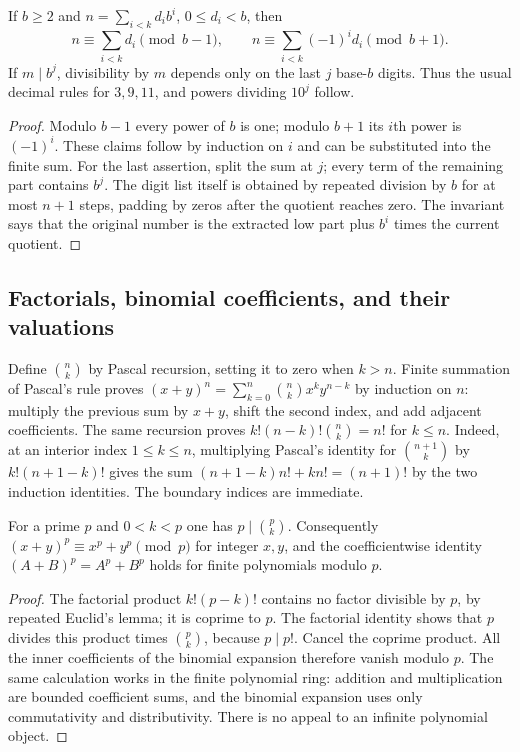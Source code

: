 \begin{theorem}\label{el:digits}
If $b\ge2$ and $n=\sum_{i<k}d_i b^i$, $0\le d_i<b$, then
\[
 n\equiv\sum_{i<k}d_i\pmod{b-1},\qquad
 n\equiv\sum_{i<k}(-1)^i d_i\pmod{b+1}.
\]
If $m\mid b^j$, divisibility by $m$ depends only on the last $j$
base-$b$ digits.  Thus the usual decimal rules for $3,9,11$, and
powers dividing $10^j$ follow.
\end{theorem}
\begin{proof}
Modulo $b-1$ every power of $b$ is one; modulo $b+1$ its $i$th power
is $(-1)^i$.  These claims follow by induction on $i$ and can be
substituted into the finite sum.  For the last assertion, split the
sum at $j$; every term of the remaining part contains $b^j$.
The digit list itself is obtained by repeated division by $b$ for at
most $n+1$ steps, padding by zeros after the quotient reaches zero.
The invariant says that the original number is the extracted low
part plus $b^i$ times the current quotient.
\end{proof}

\subsection{Factorials, binomial coefficients, and their valuations}

Define $\binom nk$ by Pascal recursion, setting it to zero when $k>n$.
Finite summation of Pascal's rule proves
$(x+y)^n=\sum_{k=0}^n\binom nkx^ky^{n-k}$ by induction on $n$:
multiply the previous sum by $x+y$, shift the second index, and add
adjacent coefficients.  The same recursion proves
$k!(n-k)!\binom nk=n!$ for $k\le n$.  Indeed, at an interior
index $1\le k\le n$, multiplying Pascal's identity for
$\binom{n+1}{k}$ by $k!(n+1-k)!$ gives the sum
$(n+1-k)n!+kn!=(n+1)!$ by the two induction identities.
The boundary indices are immediate.

\begin{theorem}
\label{el:binomial}
For a prime $p$ and $0<k<p$ one has $p\mid\binom pk$.
Consequently $(x+y)^p\equiv x^p+y^p\pmod p$ for integer $x,y$,
and the coefficientwise identity
$(A+B)^p=A^p+B^p$ holds for finite polynomials modulo $p$.
\end{theorem}
\begin{proof}
The factorial product $k!(p-k)!$ contains no factor divisible by $p$,
by repeated Euclid's lemma; it is coprime to $p$.  The factorial
identity shows that $p$ divides this product times $\binom pk$,
because $p\mid p!$.  Cancel the coprime product.  All the inner
coefficients of the binomial expansion therefore vanish modulo $p$.
The same calculation works in the finite polynomial ring: addition
and multiplication are bounded coefficient sums, and the binomial
expansion uses only commutativity and distributivity.  There is no
appeal to an infinite polynomial object.
\end{proof}

